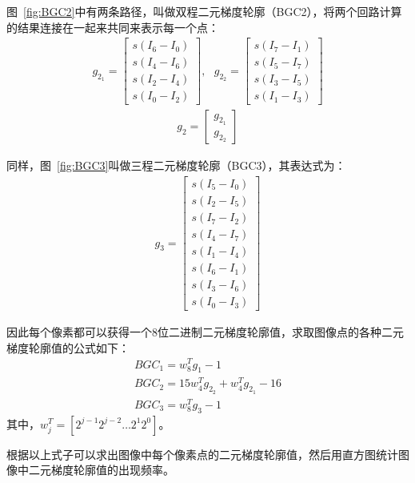 图~\ref{fig:BGC2}中有两条路径，叫做双程二元梯度轮廓（BGC2），将两个回路计算的结果连接在一起来共同来表示每一个点：
\begin{eqnarray}
g_{2_{1}}=\left[ \begin{array}{l} s(I_{6}-I_{0})\\ s(I_{4}-I_{6})\\ s(I_{2}-I_{4})\\ s(I_{0}-I_{2}) \end{array} \right] , ~~~ g_{2_{2}}=\left[ \begin{array}{l} s(I_{7}-I_{1})\\ s(I_{5}-I_{7})\\ s(I_{3}-I_{5})\\ s(I_{1}-I_{3}) \end{array} \right]
\end{eqnarray}
\begin{eqnarray}
g_{2}=\left[ \begin{array}{l} g_{2_{1}}\\ g_{2_{2}} \end{array} \right]
\end{eqnarray}

同样，图~\ref{fig:BGC3}叫做三程二元梯度轮廓（BGC3），其表达式为：
\begin{eqnarray}
g_{3}=\left[ \begin{array}{l} s(I_{5}-I_{0})\\ s(I_{2}-I_{5})\\ s(I_{7}-I_{2})\\ s(I_{4}-I_{7})\\ s(I_{1}-I_{4})\\ s(I_{6}-I_{1})\\ s(I_{3}-I_{6})\\ s(I_{0}-I_{3}) \end{array} \right]
\end{eqnarray}

因此每个像素都可以获得一个8位二进制二元梯度轮廓值，求取图像点的各种二元梯度轮廓值的公式如下：
\begin{eqnarray}
BGC_{1} = w^{T}_{8}g_{1}-1\\
BGC_{2} = 15w^{T}_{4}g_{2_{2}}+w^{T}_{4}g_{2_{1}}-16\\
BGC_{3} = w^{T}_{8}g_{3}-1
\end{eqnarray}
其中，$w^{T}_{j}=[2^{j-1}  2^{j-2}  \dots  2^{1} 2^{0}]$。

根据以上式子可以求出图像中每个像素点的二元梯度轮廓值，然后用直方图统计图像中二元梯度轮廓值的出现频率。

